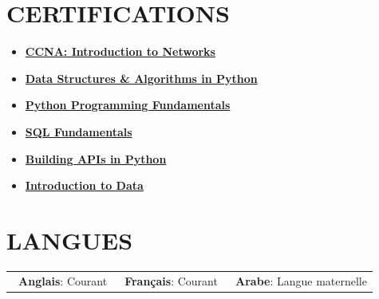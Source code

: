 \documentclass[10pt, letterpaper]{article}
\let\hrefWithoutArrow\href
\renewcommand{\href}[2]{\hrefWithoutArrow{#1}{\ifthenelse{\equal{#2}{}}{ }{#2 }\raisebox{.15ex}{\footnotesize \faExternalLink*}}}
\begin{document}
\section{CERTIFICATIONS}
 {\fontsize{9.33pt}{12pt}\selectfont
  \vspace{-0.68cm}
  \begin{multicols}{3}
	  \begin{itemize}[leftmargin=*, itemsep=0pt, topsep=0pt, parsep=0pt, partopsep=0pt]
		  \item \textbf{\hrefWithoutArrow{https://www.credly.com/badges/2faa52b1-d971-47cc-ab5f-77deb43ce4fb/linked_in_profile}{CCNA: Introduction to Networks}}
		  \item \textbf{\hrefWithoutArrow{https://www.datacamp.com/completed/statement-of-accomplishment/course/970728f8d13f505e01db21a8cdb8cc8dfe97eaab}{Data Structures \& Algorithms in Python}}
		  \item \textbf{\hrefWithoutArrow{https://www.datacamp.com/completed/statement-of-accomplishment/track/570b6b615274514fb5a8f886083784e1d1358f3f}{Python Programming Fundamentals}}
		  \item \textbf{\hrefWithoutArrow{https://www.datacamp.com/completed/statement-of-accomplishment/track/c5c3f19c391a65a517fa15b62336e4f045759095}{SQL Fundamentals}}
		  \item \textbf{\hrefWithoutArrow{https://www.datacamp.com/completed/statement-of-accomplishment/track/6c6849dcadfca0de2a113735c04f09e94f597128}{Building APIs in Python}}
		  \item \textbf{\hrefWithoutArrow{https://www.datacamp.com/completed/statement-of-accomplishment/course/43a0c70954b7ef9c1e6ef7cba8eef86f6c93e214}{Introduction to Data}}
	  \end{itemize}
  \end{multicols}
 }
\vspace{-0.55cm}

\section{LANGUES}
\vspace{-0.15cm}
\begin{tabularx}{\textwidth}{X X X}
	\textbf{\textbullet~Anglais}: Courant & \textbf{\textbullet~Français}: Courant & \textbf{\textbullet~Arabe}: Langue maternelle
\end{tabularx}
\end{document}
